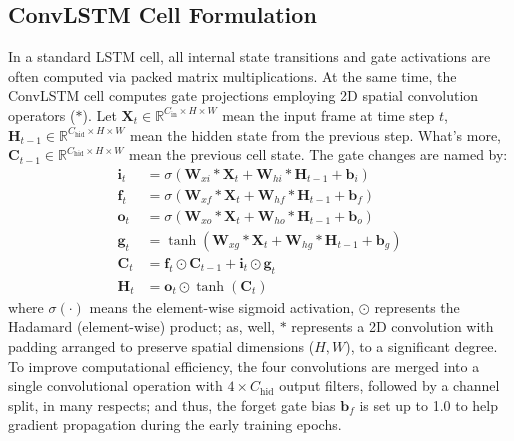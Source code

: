 \documentclass[conference]{IEEEtran}
\begin{document}
\subsection{ConvLSTM Cell Formulation}
In a standard LSTM cell, all internal state transitions and gate activations are often computed via packed matrix multiplications. At the same time, the ConvLSTM cell \cite{b4} computes gate projections employing 2D spatial convolution operators ($*$). Let $\mathbf{X}_t \in \mathbb{R}^{C_{\text{in}} \times H \times W}$ mean the input frame at time step $t$, $\mathbf{H}_{t-1} \in \mathbb{R}^{C_{\text{hid}} \times H \times W}$ mean the hidden state from the previous step. What's more, $\mathbf{C}_{t-1} \in \mathbb{R}^{C_{\text{hid}} \times H \times W}$ mean the previous cell state. The gate changes are named by:
\begin{align}
    \mathbf{i}_t &= \sigma\left( \mathbf{W}_{xi} * \mathbf{X}_t + \mathbf{W}_{hi} * \mathbf{H}_{t-1} + \mathbf{b}_i \right) \label{eq:input_gate} \\
    \mathbf{f}_t &= \sigma\left( \mathbf{W}_{xf} * \mathbf{X}_t + \mathbf{W}_{hf} * \mathbf{H}_{t-1} + \mathbf{b}_f \right) \label{eq:forget_gate} \\
    \mathbf{o}_t &= \sigma\left( \mathbf{W}_{xo} * \mathbf{X}_t + \mathbf{W}_{ho} * \mathbf{H}_{t-1} + \mathbf{b}_o \right) \label{eq:output_gate} \\
    \mathbf{g}_t &= \tanh\left( \mathbf{W}_{xg} * \mathbf{X}_t + \mathbf{W}_{hg} * \mathbf{H}_{t-1} + \mathbf{b}_g \right) \label{eq:candidate_gate} \\
    \mathbf{C}_t &= \mathbf{f}_t \odot \mathbf{C}_{t-1} + \mathbf{i}_t \odot \mathbf{g}_t \label{eq:cell_update} \\
    \mathbf{H}_t &= \mathbf{o}_t \odot \tanh(\mathbf{C}_t) \label{eq:hidden_update}
\end{align}
where $\sigma(\cdot)$ means the element-wise sigmoid activation, $\odot$ represents the Hadamard (element-wise) product; as, well, $*$ represents a 2D convolution with padding arranged to preserve spatial dimensions ($H, W$), to a significant degree. To improve computational efficiency, the four convolutions are merged into a single convolutional operation with $4 \times C_{\text{hid}}$ output filters, followed by a channel split, in many respects; and thus, the forget gate bias $\mathbf{b}_f$ is set up to 1.0 to help gradient propagation during the early training epochs.
\end{document}

